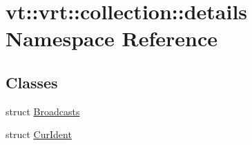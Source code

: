 \hypertarget{namespacevt_1_1vrt_1_1collection_1_1details}{}\section{vt\+:\+:vrt\+:\+:collection\+:\+:details Namespace Reference}
\label{namespacevt_1_1vrt_1_1collection_1_1details}
\subsection*{Classes}
\begin{DoxyCompactItemize}
\item 
struct \hyperlink{structvt_1_1vrt_1_1collection_1_1details_1_1_broadcasts}{Broadcasts}
\item 
struct \hyperlink{structvt_1_1vrt_1_1collection_1_1details_1_1_cur_ident}{Cur\+Ident}
\end{DoxyCompactItemize}
